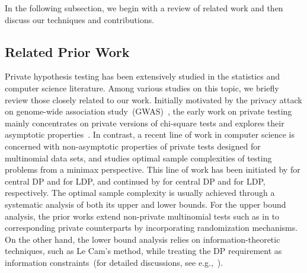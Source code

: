 \documentclass[twoside,11pt]{article}
\begin{document}
In the following subsection, we begin with a review of related work and then discuss our techniques and contributions. 

\subsection{Related Prior Work}\label{section:related_works}
Private hypothesis testing has been extensively studied in the statistics and computer science literature.
Among various studies on this topic, we briefly review those closely related to our work. Initially motivated by the privacy attack on genome-wide association study~(GWAS)~\citep{homer2008resolving}, the early work on private testing mainly concentrates on private versions of chi-square tests and explores their asymptotic properties~\citep{Gaboardi2016DPChisq, Gaboardi2018LDPChisq, Johnson2013PrivacyStudies, Kifer2017DPChisq, Uhler2013PrivacyStudies, Vu2009DifferentialEvaluations, Wang2015DPChisq, Yu2014Chisq}. In contrast, a recent line of work in computer science is concerned with non-asymptotic properties of private tests designed for multinomial data sets, and studies optimal sample complexities of testing problems from a minimax perspective. This line of work has been initiated by \citet{Cai2017DPGofPrivit} for central DP and \citet{Sheffet2018LDP} for LDP, and continued by \citet{Acharya2018dPGofTwosample, Aliakbarpour2019PrivatePermutations, Aliakbarpour2018DPgof} for central DP and \citet{Acharya2020Lowerbound, Acharya2021Lowerbound} for LDP, respectively. The optimal sample complexity is usually achieved through a systematic analysis of both its upper and lower bounds. For the upper bound analysis, the prior works extend non-private multinomial tests such as in \citep{Acharya2015Nonprivate, Chan2014Nonprivate, Diakonikolas2018Nonprivate, Diakonikolas2016Nonprivate, Goldreich2000Nonprivate, Valiant2017Nonprivate} to corresponding private counterparts by incorporating randomization mechanisms. On the other hand, the lower bound analysis relies on information-theoretic techniques, such as Le Cam's method, while treating the DP requirement as information constraints~(for detailed discussions, see e.g.,~\citet{Acharya2020Lowerbound, Duchi2018MinimaxEstimation}).
\end{document}
